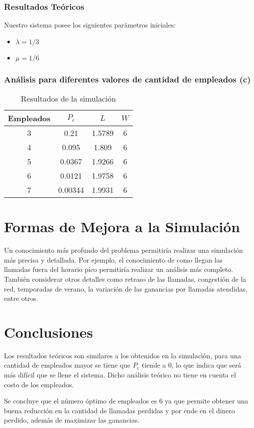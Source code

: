\documentclass{article}
\begin{document}
\subsubsection*{Resultados Teóricos}

Nuestro sistema posee los siguientes parámetros iniciales:
\begin{itemize}
    \item $\lambda = 1/3$
    \item $\mu = 1/6$
\end{itemize}

\subsubsection*{Análisis para diferentes valores de cantidad de empleados (c)}

\begin{table}[H]
    \centering
    \caption{Resultados de la simulación}
    \begin{tabular}{cccc}
        \toprule
        Empleados & $P_c$ & $L$ & $W$ \\
        \midrule
        3 & 0.21 & 1.5789 & 6 \\
        4 & 0.095 & 1.809 & 6 \\
        5 & 0.0367 & 1.9266 & 6 \\
        6 & 0.0121 & 1.9758 & 6 \\
        7 & 0.00344 & 1.9931 & 6 \\
        \bottomrule
    \end{tabular}
\end{table}

\section{Formas de Mejora a la Simulación}
Un conocimiento más profundo del problema permitiría realizar una simulación más precisa y detallada. Por ejemplo,
el conocimiento de como llegan las llamadas fuera del horario pico permitiría realizar un análisis más completo.
También considerar otros detalles como retraso de las llamadas, congestión de la red, temporadas de verano, la variación de las ganancias por llamadas atendidas, entre otros.

\section{Conclusiones}
Los resultados teóricos son similares a los obtenidos en la simulación, para una cantidad de empleados mayor se tiene que $P_c$ tiende a 0, lo que indica que será más difícil que se llene el sistema. 
Dicho análisis teórico no tiene en cuenta el costo de los empleados.

Se concluye que el número óptimo de empleados es 6 ya que permite obtener una buena reducción en la cantidad de llamadas perdidas y por ende en el dinero perdido, además de maximizar las ganancias.
\end{document}
